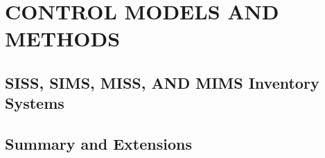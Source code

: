 \chapter{CONTROL MODELS AND METHODS}\label{chap:15}

\section{SISS, SIMS, MISS, AND MIMS Inventory Systems}


\section{Summary and Extensions}


\begin{exercises}
    \begin{exercise}
    \label{sea-8-1}
    
    \end{exercise}
    \begin{solution}
    \end{solution}

\end{exercises}